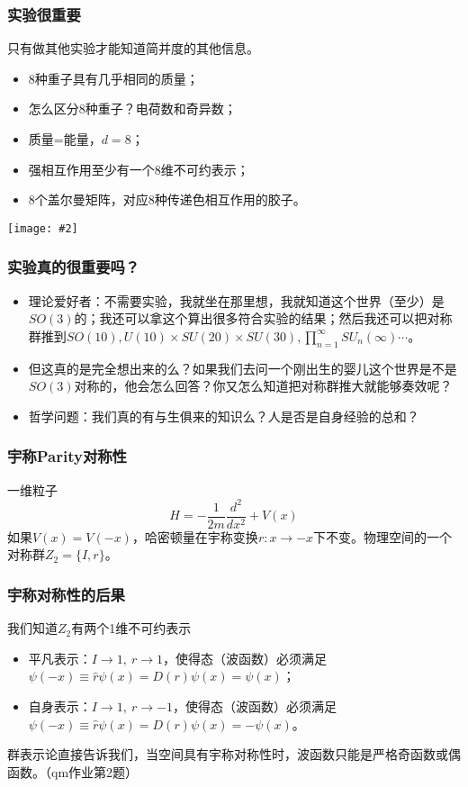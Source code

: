 \documentclass[CJK]{beamer}
\newcommand{\cpic}[2]{
\begin{center}
\texttt{[image: \#2]}
\end{center}
}
\begin{document}
\begin{frame}
\frametitle{\bch 实验很重要 \ech}
\bch
只有做其他实验才能知道简并度的其他信息。
\begin{itemize}
\item 8种重子具有几乎相同的质量；
\item 怎么区分8种重子？电荷数和奇异数；
\item 质量=能量，$d=8$；
\item 强相互作用至少有一个8维不可约表示；
\item 8个盖尔曼矩阵，对应8种传递色相互作用的胶子。
\end{itemize}
\cpic{0.2}{gmm}
\ech
\end{frame}


\begin{frame}
\frametitle{\bch 实验真的很重要吗？ \ech}
\bch
\begin{itemize}
\item
理论爱好者：不需要实验，我就坐在那里想，我就知道这个世界（至少）是$SO(3)$的；我还可以拿这个算出很多符合实验的结果；然后我还可以把对称群推到$SO(10),U(10)
\times SU(20)\times SU(30),\prod_{n=1}^{\infty} SU_n(\infty) \cdots$。
\item
但这真的是完全想出来的么？如果我们去问一个刚出生的婴儿这个世界是不是$SO(3)$对称的，他会怎么回答？你又怎么知道把对称群推大就能够奏效呢？
\item
哲学问题：我们真的有与生俱来的知识么？人是否是自身经验的总和？
\end{itemize}
\ech
\end{frame}

\begin{frame}
\frametitle{\bch  \ech}
\ech
\end{frame}


\begin{frame}
\frametitle{\bch 宇称Parity对称性\ech}
\bch
一维粒子
$$
H = -\frac{1}{2m} \frac{d^2}{dx^2} + V(x)
$$
如果$V(x) = V(-x)$，哈密顿量在宇称变换$r : x \to -x$下不变。物理空间的一个对称群$Z_2 = \{I ,r\}$。
\ech
\end{frame}

\begin{frame}
\frametitle{\bch 宇称对称性的后果\ech}
\bch
我们知道$Z_2$有两个1维不可约表示
\begin{itemize}
\item 平凡表示：$I \to 1,\ r \to 1$，使得态（波函数）必须满足$\psi(-x) \equiv \hat r \psi(x) = D(r) \psi(x) = \psi(x)$；
\item 自身表示：$I \to 1,\ r \to -1$，使得态（波函数）必须满足$\psi(-x) \equiv \hat r \psi(x) = D(r) \psi(x) = -\psi(x)$。
\end{itemize}
群表示论直接告诉我们，当空间具有宇称对称性时，波函数只能是严格奇函数或偶函数。（qm作业第2题）

\ech
\end{frame}
\end{document}

